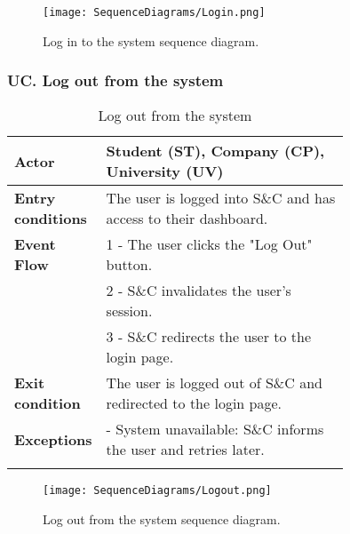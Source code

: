 \begin{figure}[H]
    \begin{center}
        \texttt{[image: SequenceDiagrams/Login.png]}
        \caption{Log in to the system sequence diagram.}
        \label{fig:login_seqd}%
    \end{center}
\end{figure}

\subsubsection*{UC\cuc . Log out from the system}
\begin{center}
    \begin{longtable}{|l|p{0.75\linewidth}|}
        \hline
        \textbf{Actor}            & Student (ST), Company (CP), University (UV) \\
        \hline
        \textbf{Entry conditions} & The user is logged into S\&C and has access to their dashboard. \\
        \hline
        \textbf{Event Flow}       & 1 - The user clicks the "Log Out" button. \\
                                  & 2 - S\&C invalidates the user's session. \\
                                  & 3 - S\&C redirects the user to the login page. \\
        \hline
        \textbf{Exit condition}   & The user is logged out of S\&C and redirected to the login page. \\       
        \hline
        \textbf{Exceptions}       & - System unavailable: S\&C informs the user and retries later. \\
        \hline
        \caption{Log out from the system}
        \label{tab:logout_usecase}
    \end{longtable}
\end{center}

\begin{figure}[H]
    \begin{center}
        \texttt{[image: SequenceDiagrams/Logout.png]}
        \caption{Log out from the system sequence diagram.}
        \label{fig:logout_seqd}%
    \end{center}
\end{figure}

